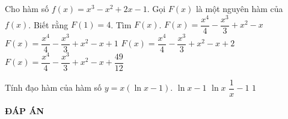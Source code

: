 \begin{ex}%
	Cho hàm số $f(x)=x^3-x^2+2x-1$. Gọi $F(x)$ là một nguyên hàm của $f(x)$. Biết rằng $F(1)=4$. Tìm $F(x)$.
	\choice
	{$F(x)=\dfrac{x^4}{4}-\dfrac{x^3}{3}+x^2-x$}
	{$F(x)=\dfrac{x^4}{4}-\dfrac{x^3}{3}+x^2-x+1$}
	{$F(x)=\dfrac{x^4}{4}-\dfrac{x^3}{3}+x^2-x+2$}
	{\True $F(x)=\dfrac{x^4}{4}-\dfrac{x^3}{3}+x^2-x+\dfrac{49}{12}$}
\end{ex}

\begin{ex}%
	Tính đạo hàm của hàm số $y=x(\ln x-1)$.
	\choice
	{$\ln x-1$}
	{\True $\ln x$}
	{$\dfrac{1}{x}-1$}
	{$1$}
\end{ex}


\newpage
\begin{center}
	\textbf{ĐÁP ÁN}
\end{center}
\begin{multicols}{10}
	 
\end{multicols}


